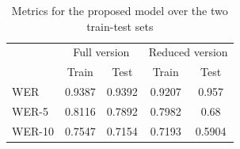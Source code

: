 \begin{table}
\caption{Metrics for the proposed model over the two train-test sets}
\label{tab:model_metrics}
\begin{center}
    \begin{tabular}{ |l|c c|c c| }
        \hline
        & \multicolumn{2}{|c|}{Full version} & \multicolumn{2}{|c|}{Reduced version}\\ 
        & Train & Test & Train & Test\\
        \hline
        WER & 0.9387 & 0.9392 & 0.9207 & 0.957\\
        WER-5 & 0.8116 & 0.7892 & 0.7982 & 0.68\\
        WER-10 & 0.7547 & 0.7154 & 0.7193 & 0.5904\\
        \hline
    \end{tabular}
\end{center}
\end{table}